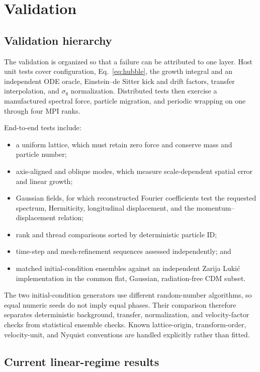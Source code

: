 \documentclass[11pt]{article}
\begin{document}
\section{Validation}
\label{sec:validation}

\subsection{Validation hierarchy}

The validation is organized so that a failure can be attributed to one layer.
Host unit tests cover configuration, Eq.~\eqref{eq:hubble}, the growth integral
and an independent ODE oracle, Einstein--de Sitter kick and drift factors,
transfer interpolation, and $\sigma_8$ normalization.  Distributed tests then
exercise a manufactured spectral force, particle migration, and periodic
wrapping on one through four MPI ranks.

End-to-end tests include:
\begin{itemize}
  \item a uniform lattice, which must retain zero force and conserve mass and
        particle number;
  \item axis-aligned and oblique modes, which measure scale-dependent spatial
        error and linear growth;
  \item Gaussian fields, for which reconstructed Fourier coefficients test the
        requested spectrum, Hermiticity, longitudinal displacement, and the
        momentum--displacement relation;
  \item rank and thread comparisons sorted by deterministic particle ID;
  \item time-step and mesh-refinement sequences assessed independently; and
  \item matched initial-condition ensembles against an independent Zarija
        Luki\'c implementation in the common flat, Gaussian, radiation-free CDM
        subset.
\end{itemize}

The two initial-condition generators use different random-number algorithms, so
equal numeric seeds do not imply equal phases.  Their comparison therefore
separates deterministic background, transfer, normalization, and velocity-factor
checks from statistical ensemble checks.  Known lattice-origin, transform-order,
velocity-unit, and Nyquist conventions are handled explicitly rather than fitted.

\subsection{Current linear-regime results}
\end{document}
